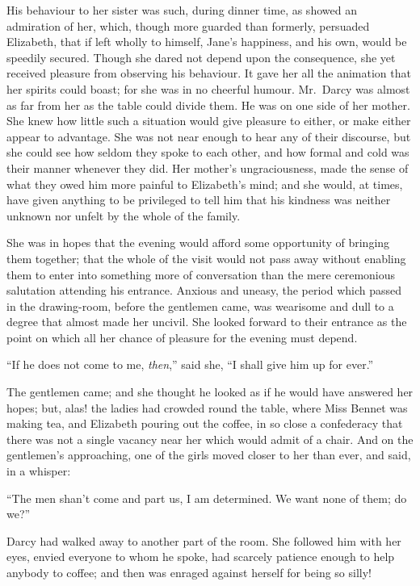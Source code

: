 His behaviour to her sister was such, during dinner time, as
showed an admiration of her, which, though more guarded than
formerly, persuaded Elizabeth, that if left wholly to himself,
Jane's happiness, and his own, would be speedily secured.
Though she dared not depend upon the consequence, she yet
received pleasure from observing his behaviour.  It gave her
all the animation that her spirits could boast; for she was in
no cheerful humour.  Mr.\ Darcy was almost as far from her as
the table could divide them.  He was on one side of her mother.
She knew how little such a situation would give pleasure to
either, or make either appear to advantage.  She was not near
enough to hear any of their discourse, but she could see how
seldom they spoke to each other, and how formal and cold was
their manner whenever they did.  Her mother's ungraciousness,
made the sense of what they owed him more painful to Elizabeth's
mind; and she would, at times, have given anything to be
privileged to tell him that his kindness was neither unknown
nor unfelt by the whole of the family.

She was in hopes that the evening would afford some opportunity
of bringing them together; that the whole of the visit would
not pass away without enabling them to enter into something
more of conversation than the mere ceremonious salutation
attending his entrance.  Anxious and uneasy, the period which
passed in the drawing-room, before the gentlemen came, was
wearisome and dull to a degree that almost made her uncivil.
She looked forward to their entrance as the point on which all
her chance of pleasure for the evening must depend.

``If he does not come to me, \emph{then},'' said she, ``I shall give
him up for ever.''

The gentlemen came; and she thought he looked as if he would
have answered her hopes; but, alas! the ladies had crowded
round the table, where Miss Bennet was making tea, and
Elizabeth pouring out the coffee, in so close a confederacy
that there was not a single vacancy near her which would admit
of a chair.  And on the gentlemen's approaching, one of the
girls moved closer to her than ever, and said, in a whisper:

``The men shan't come and part us, I am determined.  We want
none of them; do we?''

Darcy had walked away to another part of the room.  She
followed him with her eyes, envied everyone to whom he spoke,
had scarcely patience enough to help anybody to coffee; and
then was enraged against herself for being so silly!

